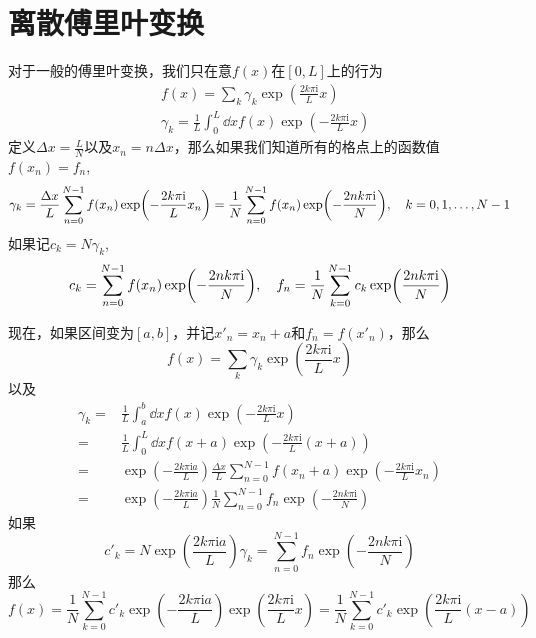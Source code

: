 \documentclass[UTF8,12pt]{article}
\begin{document}
    \section{离散傅里叶变换}
        对于一般的傅里叶变换，我们只在意$f(x)$在$[0,L]$上的行为
        \begin{align}
            &f(x)=\sum_k{\gamma_k \exp(\frac{2k\pi\mathrm{i}}{L}x)} \\
            &\gamma_k=\frac{1}{L}\int_0^L{\dd{x}f(x)\exp(-\frac{2k\pi\mathrm{i}}{L}x)}
        \end{align}
        定义$\Delta x=\frac{L}{N}$以及$x_n=n\Delta x$，那么如果我们知道所有的格点上的函数值$f(x_n)=f_n$,
        \begin{equation}
            \gamma_k=\frac{\Delta x}{L}\sum_{n=0}^{N-1}{f(x_n)\exp(-\frac{2k\pi\mathrm{i}}{L}x_n)}=\frac{1}{N}\sum_{n=0}^{N-1}{f(x_n)\exp(-\frac{2nk\pi\mathrm{i}}{N})}\qc k=0,1,\dots,N-1
        \end{equation}
        如果记$c_k=N\gamma_k$,
        \begin{equation}
            c_k=\sum_{n=0}^{N-1}{f(x_n)\exp(-\frac{2nk\pi\mathrm{i}}{N})}\qc f_n=\frac{1}{N}\sum_{k=0}^{N-1}{c_k\exp(\frac{2nk\pi\mathrm{i}}{N})}
        \end{equation}\par
        现在，如果区间变为$[a,b]$，并记$x'_n=x_n+a$和$f_n=f(x'_n)$，那么
        \begin{equation}
            f(x)=\sum_k{\gamma_k \exp(\frac{2k\pi\mathrm{i}}{L}x)}
        \end{equation}
        以及
        \begin{align}
            \gamma_k=&\frac{1}{L}\int_a^b{\dd{x}f(x)\exp(-\frac{2k\pi\mathrm{i}}{L}x)} \\
            =&\frac{1}{L}\int_0^L{\dd{x}f(x+a)\exp(-\frac{2k\pi\mathrm{i}}{L}(x+a))} \\
            =&\exp(-\frac{2k\pi\mathrm{i}a}{L})\frac{\Delta x}{L}\sum_{n=0}^{N-1}{f(x_n+a)\exp(-\frac{2k\pi\mathrm{i}}{L}x_n)} \\
            =&\exp(-\frac{2k\pi\mathrm{i}a}{L})\frac{1}{N}\sum_{n=0}^{N-1}{f_n\exp(-\frac{2nk\pi\mathrm{i}}{N})}
        \end{align}
        如果
        \begin{equation}
            c'_k=N\exp(\frac{2k\pi\mathrm{i}a}{L})\gamma_k=\sum_{n=0}^{N-1}{f_n\exp(-\frac{2nk\pi\mathrm{i}}{N})}
        \end{equation}
        那么
        \begin{equation}
            f(x)=\frac{1}{N}\sum_{k=0}^{N-1}{c'_k\exp(-\frac{2k\pi\mathrm{i}a}{L}) \exp(\frac{2k\pi\mathrm{i}}{L}x)}=\frac{1}{N}\sum_{k=0}^{N-1}{c'_k\exp(\frac{2k\pi\mathrm{i}}{L}(x-a))}
        \end{equation}
\end{document}
